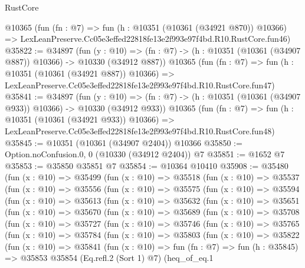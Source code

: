 \begin{lexlean}{RustCore}
\begin{coremodule}
    @10365
    (fun (fn : @7) =>
    fun (h : @10351 (@10361 (@34921 @870)) @10366) =>
    LexLeanPreserve.Cc05e3effed22818fe13e2f993e97f4bd.R10.RustCore.fun46)
@35822 := @34897
    (fun (y : @10) =>
    (fn : @7) -> (h : @10351 (@10361 (@34907 @887)) @10366) -> @10330 (@34912 @887))
    @10365
    (fun (fn : @7) =>
    fun (h : @10351 (@10361 (@34921 @887)) @10366) =>
    LexLeanPreserve.Cc05e3effed22818fe13e2f993e97f4bd.R10.RustCore.fun47)
@35841 := @34897
    (fun (y : @10) =>
    (fn : @7) -> (h : @10351 (@10361 (@34907 @933)) @10366) -> @10330 (@34912 @933))
    @10365
    (fun (fn : @7) =>
    fun (h : @10351 (@10361 (@34921 @933)) @10366) =>
    LexLeanPreserve.Cc05e3effed22818fe13e2f993e97f4bd.R10.RustCore.fun48)
@35845 := @10351 (@10361 (@34907 @2404)) @10366
@35850 := Option.noConfusion.{0, 0} (@10330 (@34912 @2404)) @7
@35851 := @1652 @7
@35853 := @35850 @35851 @7
@35854 := @10364 @10410
@35908 := @35480
    (fun (x : @10) =>
    @35499
      (fun (x : @10) =>
      @35518
        (fun (x : @10) =>
        @35537
          (fun (x : @10) =>
          @35556
            (fun (x : @10) =>
            @35575
              (fun (x : @10) =>
              @35594
                (fun (x : @10) =>
                @35613
                  (fun (x : @10) =>
                  @35632
                    (fun (x : @10) =>
                    @35651
                      (fun (x : @10) =>
                      @35670
                        (fun (x : @10) =>
                        @35689
                          (fun (x : @10) =>
                          @35708
                            (fun (x : @10) =>
                            @35727
                              (fun (x : @10) =>
                              @35746
                                (fun (x : @10) =>
                                @35765
                                  (fun (x : @10) =>
                                  @35784
                                    (fun (x : @10) =>
                                    @35803
                                      (fun (x : @10) =>
                                      @35822
                                        (fun (x : @10) =>
                                        @35841
                                          (fun (x : @10) =>
                                          fun (fn : @7) =>
                                          fun (h : @35845) =>
                                          @35853
                                            @35854
                                            (Eq.refl.{2} (Sort 1) @7)
                                            (heq_of_eq.{1}

\end{coremodule}
\end{lexlean}

